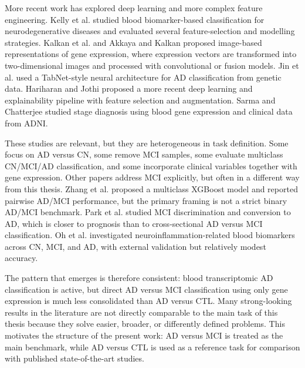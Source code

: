 More recent work has explored deep learning and more complex feature engineering. Kelly et al. \cite{kelly2023blood} studied blood biomarker-based classification for neurodegenerative diseases and evaluated several feature-selection and modelling strategies. Kalkan et al. \cite{kalkan2022image} and Akkaya and Kalkan \cite{akkaya2023one2mfusion} proposed image-based representations of gene expression, where expression vectors are transformed into two-dimensional images and processed with convolutional or fusion models. Jin et al. \cite{jin2023tabnet} used a TabNet-style neural architecture for AD classification from genetic data. Hariharan and Jothi \cite{hariharan2026xai} proposed a more recent deep learning and explainability pipeline with feature selection and augmentation. Sarma and Chatterjee \cite{sarma2025diagnostics} studied stage diagnosis using blood gene expression and clinical data from ADNI.

These studies are relevant, but they are heterogeneous in task definition. Some focus on AD versus CN, some remove MCI samples, some evaluate multiclass CN/MCI/AD classification, and some incorporate clinical variables together with gene expression. Other papers address MCI explicitly, but often in a different way from this thesis. Zhang et al. \cite{zhang2024xgboost} proposed a multiclass XGBoost model and reported pairwise AD/MCI performance, but the primary framing is not a strict binary AD/MCI benchmark. Park et al. \cite{park2024transcriptomics} studied MCI discrimination and conversion to AD, which is closer to prognosis than to cross-sectional AD versus MCI classification. Oh et al. \cite{oh2022neuroinflammation} investigated neuroinflammation-related blood biomarkers across CN, MCI, and AD, with external validation but relatively modest accuracy.

The pattern that emerges is therefore consistent: blood transcriptomic AD classification is active, but direct AD versus MCI classification using only gene expression is much less consolidated than AD versus CTL. Many strong-looking results in the literature are not directly comparable to the main task of this thesis because they solve easier, broader, or differently defined problems. This motivates the structure of the present work: AD versus MCI is treated as the main benchmark, while AD versus CTL is used as a reference task for comparison with published state-of-the-art studies.

